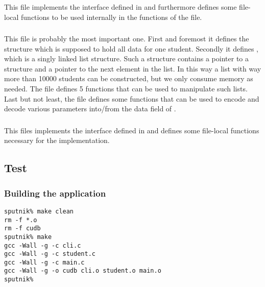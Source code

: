 \subsubsection*{}
This file implements the interface defined in  and 
furthermore defines some file-local functions to be used internally 
in the functions of the file.

\subsubsection*{}
This file is probably the most important one. First and foremost it
defines the structure  which is supposed to hold all 
data for one student. Secondly it defines , which is a 
singly linked list structure. Such a structure contains a pointer to
a  structure and a pointer to the next  element 
in the list. In this way a list with way more than 10000 students can be
constructed, but we only consume memory as needed.
The file defines 5 functions that can be used to manipulate such lists.
Last but not least, the file defines some functions that can be used
to encode and decode various parameters into/from the data field of .

\subsubsection*{}
This files implements the interface defined in  and defines some
file-local functions necessary for the implementation.

\subsection*{Test}
\subsubsection*{Building the application}
\begin{verbatim}
sputnik% make clean
rm -f *.o
rm -f cudb
sputnik% make
gcc -Wall -g -c cli.c
gcc -Wall -g -c student.c
gcc -Wall -g -c main.c
gcc -Wall -g -o cudb cli.o student.o main.o
sputnik% 
\end{verbatim}

